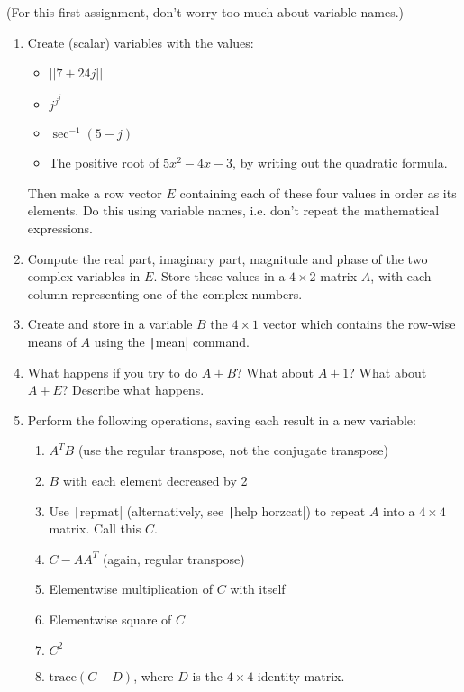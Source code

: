 \documentclass{article}
\begin{document}
\clearpage
(For this first assignment, don't worry too much about variable names.)
\begin{enumerate}
\item Create (scalar) variables with the values:
  \begin{itemize}
  \item $||7+24j||$
  \item $j^{j^j}$
  \item $\sec^{-1}(5-j)$
  \item The positive root of $5x^2-4x-3$, by writing out the quadratic formula.
  \end{itemize}
  Then make a row vector $E$ containing each of these four values in order as its elements. Do this using variable names, i.e. don't repeat the mathematical expressions.
  
\item Compute the real part, imaginary part, magnitude and phase of the two complex variables in $E$. Store these values in a $4\times 2$ matrix $A$, with each column representing one of the complex numbers.
  
\item Create and store in a variable $B$ the $4\times 1$ vector which contains the row-wise means of $A$ using the \texttt|mean| command.

  \item What happens if you try to do $A+B?$ What about $A+1$? What about $A+E$? Describe what happens.
  
\item Perform the following operations, saving each result in a new variable:
  \begin{enumerate}
  \item $A^TB$ (use the regular transpose, not the conjugate transpose)
  \item $B$ with each element decreased by 2
  \item Use \texttt|repmat| (alternatively, see \texttt|help horzcat|) to repeat $A$ into a $4\times 4$ matrix. Call this $C$.
  \item $C-AA^T$ (again, regular transpose)
  \item Elementwise multiplication of $C$ with itself
  \item Elementwise square of $C$
  \item $C^2$
  \item $\text{trace}(C-D)$, where $D$ is the $4\times 4$ identity matrix.
  \end{enumerate}
  

\end{enumerate}
\end{document}
